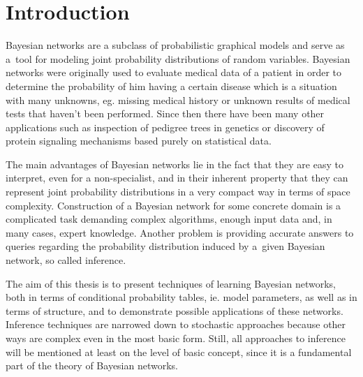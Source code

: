 \documentclass[english,cover]{fitthesis} %
\begin{document}
  \maketitle
  \tableofcontents
  


  









\chapter{Introduction}
\vspace{-0.7mm}
Bayesian networks are a subclass of probabilistic graphical models and serve as a~tool for modeling joint probability distributions of random variables. Bayesian networks were originally used to evaluate medical data of a patient in order to determine the probability of him having a certain disease which is a situation with many unknowns, eg. missing medical history or unknown results of medical tests that haven't been performed. Since then there have been many other applications such as inspection of pedigree trees in genetics or discovery of protein signaling mechanisms based purely on statistical data.

The main advantages of Bayesian networks lie in the fact that they are easy to interpret, even for a non-specialist, and in their inherent property that they can represent joint probability distributions in a very compact way in terms of space complexity. Construction of a Bayesian network for some concrete domain is a complicated task demanding complex algorithms, enough input data and, in many cases, expert knowledge. Another problem is providing accurate answers to queries regarding the probability distribution induced by a~given Bayesian network, so called inference.

The aim of this thesis is to present techniques of learning Bayesian networks, both in terms of conditional probability tables, ie. model parameters, as well as in terms of structure, and to demonstrate possible applications of these networks. Inference techniques are narrowed down to stochastic approaches because other ways are complex even in the most basic form. Still, all approaches to inference will be mentioned at least on the level of basic concept, since it is a fundamental part of the theory of Bayesian networks.
\end{document}
